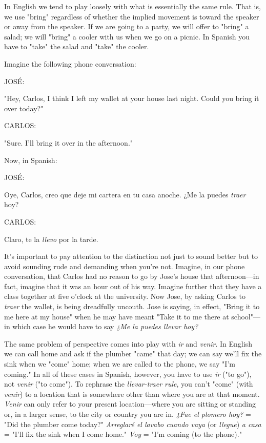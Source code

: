 \documentclass[14pt,a4paper,oneside]{memoir}
\newcommand{\bsk}{\vspace{20pt}}
\newcommand{\inda}{\hspace{40pt}}
\newcommand{\indu}{\hspace{20pt}}
\begin{document}
In English we tend to play loosely with what is essentially the
same rule. That is, we use "bring" regardless of whether the implied
movement is toward the speaker or away from the speaker. If we are
going to a party, we will offer to "bring" a salad; we will "bring" a
cooler with us when we go on a picnic. In Spanish you have to "take"
the salad and "take" the cooler.

\bsk

Imagine the following phone conversation:

\bsk

\inda JOSÉ:

\indu "Hey, Carlos, I think I left my wallet at your house last night.
Could you bring it over today?"

\inda CARLOS:

\indu "Sure. I'll bring it over in the afternoon."

\bsk

Now, in Spanish:

\bsk

\inda JOSÉ:

\indu Oye, Carlos, creo que deje mi cartera en tu casa anoche. ¿Me la
puedes \emph{traer} hoy?

\inda CARLOS:

\indu Claro, te la \emph{llevo} por la tarde.

\bsk

It's important to pay attention to the distinction not just to
sound better but to avoid sounding rude and demanding when you're
not. Imagine, in our phone conversation, that Carlos had no reason
to go by Jose's house that afternoon---in fact, imagine that it was an
hour out of his way. Imagine further that they have a class together
at five o'clock at the university. Now Jose, by asking Carlos to \emph{traer}
the wallet, is being dreadfully uncouth. Jose is saying, in effect, "Bring
it to me here at my house" when he may have meant "Take it to me
there at school"---in which case he would have to say \emph{¿Me la puedes
llevar hoy?}

The same problem of perspective comes into play with \emph{ir} and
\emph{venir}. In English we can call home and ask if the plumber "came" that
day; we can say we'll fix the sink when we "come" home; when we are
called to the phone, we say "I'm coming." In all of these cases in Spanish, however, you have to use \emph{ir} ("to go"), not \emph{venir} ("to come"). To
rephrase the \emph{llevar-traer rule}, you can't "come" (with \emph{venir}) to a location that is somewhere other than where you are at that moment.
\emph{Venir} can only refer to your present location---where you are sitting or
standing or, in a larger sense, to the city or country you are in. \emph{¿Fue el
plomero hoy?} = "Did the plumber come today?" \emph{Arreglaré el lavabo
cuando vaya} (or \emph{llegue}) \emph{a casa} = "I'll fix the sink when I come home."
\emph{Voy} = "I'm coming (to the phone)."
\end{document}
